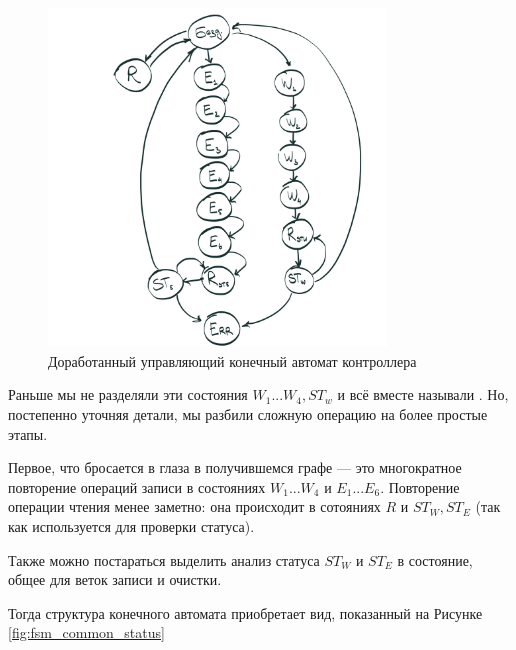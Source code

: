 \begin{figure}[H]
\centering
% 
\includegraphics[width=0.8\textwidth]{./images/lab_6/fsm_extended}
\caption{Доработанный управляющий конечный автомат контроллера }
\label{fig:fsm_extended}
\end{figure}

\par{Раньше мы не разделяли эти состояния $W_1 ... W_4, ST_w$ и всё вместе называли . Но, постепенно уточняя детали, мы разбили сложную операцию на более простые этапы.}
\par{Первое, что бросается в глаза в получившемся графе --- это многократное повторение операций записи в состояниях $W_1 ... W_4$ и $E_1 ... E_6$. Повторение операции чтения менее заметно: она происходит в сотояниях $R$ и $ST_W, ST_E$ (так как используется для проверки статуса).}
\par{Также можно постараться выделить анализ статуса $ST_W$ и $ST_E$ в состояние, общее для веток записи и очистки.}
\par{Тогда структура конечного автомата приобретает вид, показанный на Рисунке \ref{fig:fsm_common_status}}

